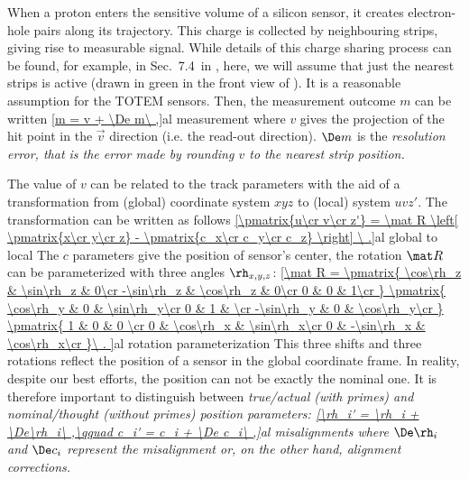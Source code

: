 When a proton enters the sensitive volume of a silicon sensor, it creates electron-hole pairs along its trajectory. This charge is collected by neighbouring strips, giving rise to measurable signal. While details of this charge sharing process can be found, for example, in Sec.~7.4~in , here, we will assume that just the nearest strips is active (drawn in green in the front view of ). It is a reasonable assumption for the TOTEM sensors. Then, the measurement outcome $m$ can be written
\eqref{m = v + \De m\ ,}{al measurement}
where $v$ gives the projection of the hit point in the $\vec v$ direction (i.e. the read-out direction). $\De m$ is the \em{resolution error}, that is the error made by rounding $v$ to the nearest strip position.


The value of $v$ can be related to the track parameters with the aid of a transformation from (global) coordinate system $xyz$ to (local) system $uvz'$. The transformation can be written as follows
\eqref{\pmatrix{u\cr v\cr z'} = \mat R \left[ \pmatrix{x\cr y\cr z}  - \pmatrix{c_x\cr c_y\cr c_z}  \right] \ .}{al global to local}
The $c$ parameters give the position of sensor's center, the rotation $\mat R$ can be parameterized with three angles $\rh_{x,y,z}$:
\eqref{\mat R =
	\pmatrix{
		\cos\rh_z  & \sin\rh_z & 0\cr
		-\sin\rh_z & \cos\rh_z & 0\cr
		0		   & 0         & 1\cr
	}
	\pmatrix{
		\cos\rh_y  & 0 & \sin\rh_y\cr
		0		   & 1 &          \cr
		-\sin\rh_y & 0 & \cos\rh_y\cr
	}
	\pmatrix{
		1 & 0		   & 0        \cr
		0 & \cos\rh_x  & \sin\rh_x\cr
		0 & -\sin\rh_x & \cos\rh_x\cr
	}\ .
}{al rotation parameterization}
This three shifts and three rotations reflect the position of a sensor in the global coordinate frame. In reality, despite our best efforts, the position can not be exactly the nominal one. It is therefore important to distinguish between \em{true/actual} (with primes) and \em{nominal/thought} (without primes) position parameters:
\eqref{\rh_i' = \rh_i + \De\rh_i\ ,\qquad c_i' = c_i + \De c_i\ ,}{al misalignments}
where $\De\rh_i$ and $\De c_i$ represent the \em{misalignment} or, on the other hand, \em{alignment corrections}.

